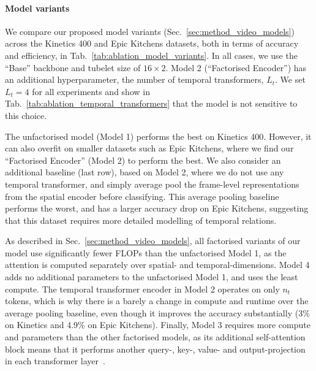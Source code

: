 


\paragraph{Model variants}
We compare our proposed model variants (Sec.~\ref{sec:method_video_models}) across the Kinetics 400 and Epic Kitchens datasets, both in terms of accuracy and efficiency, in Tab.~\ref{tab:ablation_model_variants}.
In all cases, we use the ``Base'' backbone and tubelet size of $16 \times 2$.
Model 2 (``Factorised Encoder'') has an additional hyperparameter, the number of temporal transformers, $L_t$.
We set $L_t = 4$ for all experiments and show in Tab.~\ref{tab:ablation_temporal_transformers} that the model is not sensitive to this choice.

The unfactorised model (Model 1) performs the best on Kinetics 400.
However, it can also overfit on smaller datasets such as Epic Kitchens, where we find our ``Factorised Encoder'' (Model 2) to perform the best.
We also consider an additional baseline (last row), based on Model 2, where we do not use any temporal transformer, and simply average pool the frame-level representations from the spatial encoder before classifying.
This average pooling baseline performs the worst, and has a larger accuracy drop on Epic Kitchens, suggesting that this dataset requires more detailed modelling of temporal relations.

As described in Sec.~\ref{sec:method_video_models}, all factorised variants of our model use significantly fewer FLOPs than the unfactorised Model 1, as the attention is computed separately over spatial- and temporal-dimensions.
Model 4 adds no additional parameters to the unfactorised Model 1, and uses the least compute.
The temporal transformer encoder in Model 2 operates on only $n_t$ tokens, which is why there is a barely a change in compute and runtime over the average pooling baseline, even though it improves the accuracy substantially (3\% on Kinetics and 4.9\% on Epic Kitchens).
Finally, Model 3 requires more compute and parameters than the other factorised models, as its additional self-attention block means that it performs another query-, key-, value- and output-projection in each transformer layer~\cite{vaswani_neurips_2017}.





